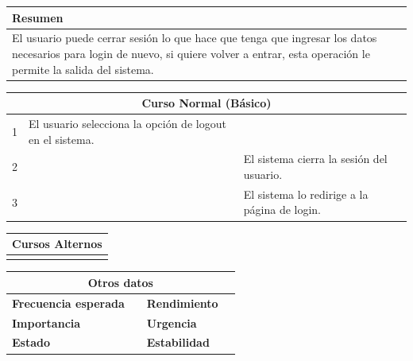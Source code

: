 \vspace{0.2cm}

\begin{table}[h!]
\centering
\begin{tabularx}{\textwidth}{|X|}
\hline
\cellcolor[HTML]{F2F2F2}\textbf{Resumen} \\ \hline
El usuario puede cerrar sesión lo que hace que tenga que ingresar los datos necesarios para login de nuevo, si quiere volver a entrar, esta operación le permite la salida del sistema. \\ \hline
\end{tabularx}
\end{table}

\vspace{0.2cm}

\begin{table}[h!]
\centering
\begin{tabularx}{\textwidth}{|c|X|X|}
\hline
\multicolumn{3}{|c|}{\cellcolor[HTML]{F2F2F2}\textbf{Curso Normal (Básico)}} \\ \hline
1 & El usuario selecciona la opción de logout en el sistema. & \\ \hline
2 & & El sistema cierra la sesión del usuario. \\ \hline
3 & & El sistema lo redirige a la página de login. \\ \hline
\end{tabularx}
\end{table}

\vspace{0.2cm}

\begin{table}[h!]
\centering
\begin{tabularx}{\textwidth}{|c|X|}
\hline
\multicolumn{2}{|c|}{\cellcolor[HTML]{F2F2F2}\textbf{Cursos Alternos}} \\ \hline
 & \\ \hline
\end{tabularx}
\end{table}

\vspace{0.2cm}

\begin{table}[h!]
\centering
\begin{tabularx}{\textwidth}{|X|X|X|X|}
\hline
\multicolumn{4}{|c|}{\cellcolor[HTML]{F2F2F2}\textbf{Otros datos}} \\ \hline
\textbf{Frecuencia esperada} &  & \textbf{Rendimiento} &  \\ \hline
\textbf{Importancia} &  & \textbf{Urgencia} &  \\ \hline
\textbf{Estado} &  & \textbf{Estabilidad} &  \\ \hline
\end{tabularx}
\end{table}

